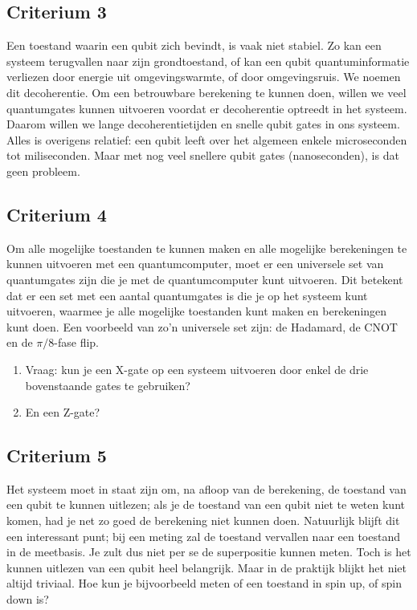 \documentclass[../../main.tex]{subfiles}
\begin{document}
\subsection{Criterium 3}
Een toestand waarin een qubit zich bevindt, is vaak niet stabiel. Zo kan een systeem terugvallen naar zijn grondtoestand, of kan een qubit quantuminformatie verliezen door energie uit omgevingswarmte, of door omgevingsruis. We noemen dit decoherentie. Om een betrouwbare berekening te kunnen doen, willen we veel quantumgates kunnen uitvoeren voordat er decoherentie optreedt in het systeem. Daarom willen we lange decoherentietijden en snelle qubit gates in ons systeem. Alles is overigens relatief: een qubit leeft over het algemeen enkele microseconden tot miliseconden. Maar met nog veel snellere qubit gates (nanoseconden), is dat geen probleem. 

\subsection{Criterium 4}
Om alle mogelijke toestanden te kunnen maken en alle mogelijke berekeningen te kunnen uitvoeren met een quantumcomputer, moet er een universele set van quantumgates zijn die je met de quantumcomputer kunt uitvoeren. Dit betekent dat er een set met een aantal quantumgates is die je op het systeem kunt uitvoeren, waarmee je alle mogelijke toestanden kunt maken en berekeningen kunt doen. Een voorbeeld van zo'n universele set zijn: de Hadamard, de CNOT en de $\pi/8$-fase flip.

\begin{opdracht}
\begin{enumerate}
\item Vraag: kun je een X-gate op een systeem uitvoeren door enkel de drie bovenstaande gates te gebruiken?
\item En een Z-gate?
\end{enumerate}
\end{opdracht}

\subsection{Criterium 5}
Het systeem moet in staat zijn om, na afloop van de berekening, de toestand van een qubit te kunnen uitlezen; als je de toestand van een qubit niet te weten kunt komen, had je net zo goed de berekening niet kunnen doen. Natuurlijk blijft dit een interessant punt; bij een meting zal de toestand vervallen naar een toestand in de meetbasis. Je zult dus niet per se de superpositie kunnen meten. Toch is het kunnen uitlezen van een qubit heel belangrijk. Maar in de praktijk blijkt het niet altijd triviaal. Hoe kun je bijvoorbeeld meten of een toestand in spin up, of spin down is? 
\end{document}
